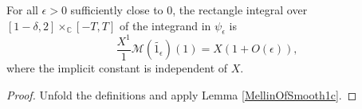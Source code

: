 \begin{theorem}[ZetaBoxEval]
\label{ZetaBoxEval}
\leanok
For all $\epsilon > 0$ sufficiently close to $0$, the rectangle integral over $[1-\delta,2] \times_{ℂ} [-T,T]$ of the integrand in
  $\psi_{\epsilon}$ is
  $$
  \frac{X^{1}}{1}\mathcal{M}(\widetilde{1_{\epsilon}})(1)
  = X(1+O(\epsilon))
  ,$$
  where the implicit constant is independent of $X$.
\end{theorem}
\begin{proof}
\leanok
Unfold the definitions and apply Lemma \ref{MellinOfSmooth1c}.
\end{proof}
